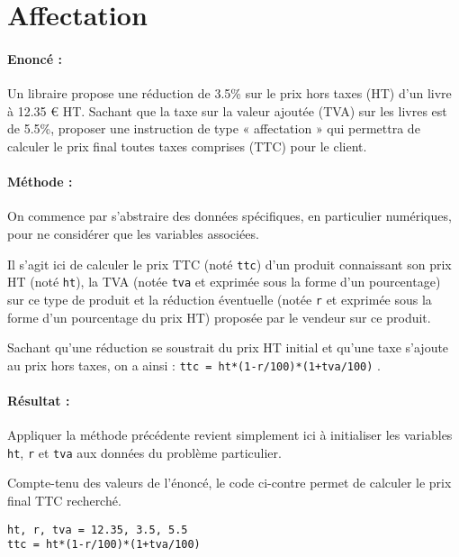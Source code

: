 \documentclass[11pt,a4paper]{article}
\begin{document}

\section{Affectation}

\paragraph{Enoncé :} 
Un libraire propose une réduction de 3.5\% sur le prix hors taxes (HT) 
d'un livre à 12.35 \euro{} HT.
Sachant que la taxe sur la valeur ajoutée (TVA) sur les livres est de 5.5\%, 
proposer une instruction de type « affectation » qui permettra de calculer 
le prix final toutes taxes comprises (TTC) pour le client.
	
\paragraph{Méthode :}
On commence par s'abstraire 
des données spécifiques, en particulier numériques, pour ne considérer que les variables associées. 

Il s'agit ici de calculer le prix TTC (noté \texttt{ttc}) d'un produit
connaissant son prix HT (noté \texttt{ht}), la TVA (notée \texttt{tva} et
exprimée sous la forme d'un pourcentage) sur ce type de produit et 
la réduction éventuelle (notée \texttt{r} et exprimée sous la forme d'un 
pourcentage du prix HT) proposée par le vendeur sur ce produit.

Sachant qu'une réduction se soustrait du prix HT initial et 
qu'une taxe s'ajoute au prix hors taxes,
on a ainsi : \texttt{ttc = ht*(1-r/100)*(1+tva/100)} .

\paragraph{Résultat :}
Appliquer la méthode précédente revient simplement ici à initialiser les variables
\texttt{ht}, \texttt{r} et \texttt{tva} aux données du problème particulier.

\noindent\begin{minipage}{7cm}
Compte-tenu des valeurs de l'énoncé, le code \python{} ci-contre
permet de calculer le prix final TTC recherché.
\end{minipage}
\hfill
\begin{minipage}{8.25cm}
\begin{lstlisting}[caption=\textbf{prix d'un livre}]
ht, r, tva = 12.35, 3.5, 5.5
ttc = ht*(1-r/100)*(1+tva/100)
\end{lstlisting}
\end{minipage}
\end{document}
